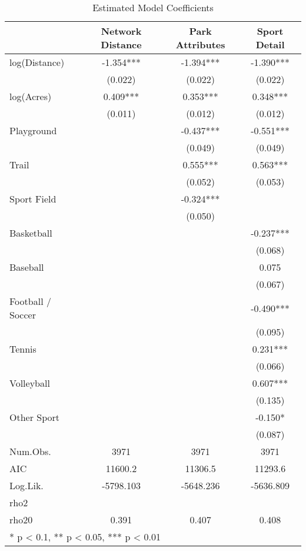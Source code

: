 \documentclass[3p, authoryear]{elsarticle} %
\begin{document}
\begin{table}

\caption{\label{tab:base-modelsummary}Estimated Model Coefficients}
\centering
\begin{tabular}[t]{lccc}
\toprule
  & Network Distance & Park Attributes & Sport Detail\\
\midrule
log(Distance) & -1.354*** & -1.394*** & -1.390***\\
 & (0.022) & (0.022) & (0.022)\\
log(Acres) & 0.409*** & 0.353*** & 0.348***\\
 & (0.011) & (0.012) & (0.012)\\
Playground &  & -0.437*** & -0.551***\\
 &  & (0.049) & (0.049)\\
Trail &  & 0.555*** & 0.563***\\
 &  & (0.052) & (0.053)\\
Sport Field &  & -0.324*** & \\
 &  & (0.050) & \\
Basketball &  &  & -0.237***\\
 &  &  & (0.068)\\
Baseball &  &  & 0.075\\
 &  &  & (0.067)\\
Football / Soccer &  &  & -0.490***\\
 &  &  & (0.095)\\
Tennis &  &  & 0.231***\\
 &  &  & (0.066)\\
Volleyball &  &  & 0.607***\\
 &  &  & (0.135)\\
Other Sport &  &  & -0.150*\\
 &  &  & (0.087)\\
\midrule
Num.Obs. & 3971 & 3971 & 3971\\
AIC & 11600.2 & 11306.5 & 11293.6\\
Log.Lik. & -5798.103 & -5648.236 & -5636.809\\
rho2 &  &  & \\
rho20 & 0.391 & 0.407 & 0.408\\
\bottomrule
\multicolumn{4}{l}{\textsuperscript{} * p < 0.1, ** p < 0.05, *** p < 0.01}\\
\end{tabular}
\end{table}
\end{document}
